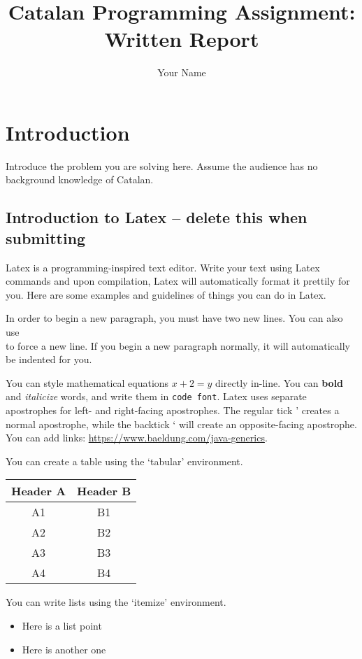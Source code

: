\documentclass{article}
\title{Catalan Programming Assignment: \\Written Report}
\author{Your Name}
\begin{document}
\maketitle

\section{Introduction}
Introduce the problem you are solving here. Assume the audience has no background knowledge of Catalan.

\subsection{Introduction to Latex -- delete this when submitting}
Latex is a programming-inspired text editor. Write your text using Latex commands and upon compilation, Latex will automatically format it prettily for you. Here are some examples and guidelines of things you can do in Latex.

In order to begin a new paragraph, you must have two new lines. You can also use \\ to force a new line. If you begin a new paragraph normally, it will automatically be indented for you.

You can style mathematical equations $x+2=y$ directly in-line. You can \textbf{bold} and \textit{italicize} words, and write them in \texttt{code font}. Latex uses separate apostrophes for left- and right-facing apostrophes. The regular tick ' creates a normal apostrophe, while the backtick ` will create an opposite-facing apostrophe. You can add links: \url{https://www.baeldung.com/java-generics}.

You can create a table using the `tabular' environment.

\begin{center}
\begin{tabular}{|c|c|} 
 \hline
 Header A & Header B \\
 \hline
 \hline
 A1 & B1 \\ 
 \hline
 A2 & B2 \\ 
 \hline
 A3 & B3 \\ 
 \hline
 A4 & B4 \\ 
 \hline
\end{tabular}
\end{center}

You can write lists using the `itemize' environment.

\begin{itemize}
    \item Here is a list point
    \item Here is another one
\end{itemize}
\end{document}

